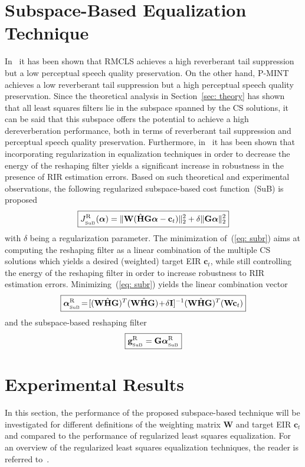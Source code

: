 \documentclass[11pt,draftcls,onecolumn]{IEEEtran}
\begin{document}
\section{Subspace-Based Equalization Technique}
In~\cite{Kodrasi_ITASLP_2013} it has been shown that RMCLS achieves a high reverberant tail suppression but a low perceptual speech quality preservation. 
On the other hand, P-MINT achieves a low reverberant tail suppression but a high perceptual speech quality preservation.
Since the theoretical analysis in Section~\ref{sec: theory} has shown that all least squares filters lie in the subspace spanned by the CS solutions, it can be said that this subspace offers the potential to achieve a high dereverberation performance, both in terms of reverberant tail suppression and perceptual speech quality preservation.
Furthermore, in~\cite{Kodrasi_ITASLP_2013} it has been shown that incorporating regularization in equalization techniques in order to decrease the energy of the reshaping filter yields a significant increase in robustness in the presence of RIR estimation errors.
Based on such theoretical and experimental observations, the following regularized subspace-based cost function~(SuB) is proposed
\begin{equation}
  \label{eq: subr}
\boxed{J_{_{\rm SuB}}^{\rm R}(\boldsymbol \alpha) = \|\mathbf{W}(\hat{\mathbf{H}}\mathbf{G}\boldsymbol \alpha-\mathbf{c}_t) \|_2^2 + \delta \|\mathbf{G}\boldsymbol \alpha \|_2^2}
\end{equation}
with $\delta$ being a regularization parameter.
The minimization of~(\ref{eq: subr}) aims at computing the reshaping filter as a linear combination of the multiple CS solutions which yields a desired (weighted) target EIR $\mathbf{c}_t$, while still controlling the energy of the reshaping filter in order to increase robustness to RIR estimation errors.
Minimizing~(\ref{eq: subr}) yields the linear combination vector
\begin{equation}
\boxed{\boldsymbol \alpha_{_{\rm SuB}}^{\rm R} \!=\! [(\mathbf{W}\hat{\mathbf{H}}\mathbf{G})^T(\mathbf{W}\hat{\mathbf{H}}\mathbf{G}) \!+\! \delta \mathbf{I}]^{-1}(\mathbf{W}\hat{\mathbf{H}}\mathbf{G})^T(\mathbf{W}\mathbf{c}_t)}
\end{equation}
and the subspace-based reshaping filter
\begin{equation}
\boxed{\mathbf{g}_{_{\rm SuB}}^{\rm R} = \mathbf{G}\boldsymbol \alpha_{_{\rm SuB}}^{\rm R}}
\end{equation}

\section{Experimental Results}
In this section, the performance of the proposed subspace-based technique will be investigated for different definitions of the weighting matrix $\mathbf{W}$ and target EIR $\mathbf{c}_t$ and compared to the performance of regularized least squares equalization. For an overview of the regularized least squares equalization techniques, the reader is referred to~\cite{Kodrasi_ITASLP_2013}.
\end{document}

